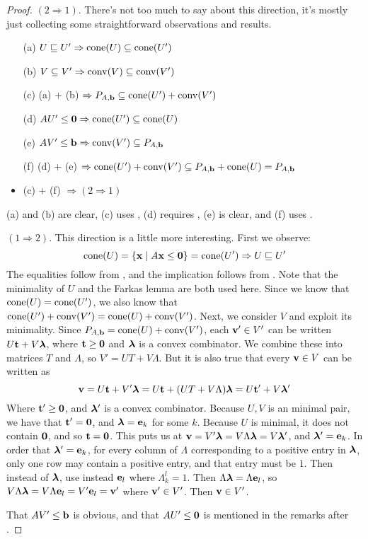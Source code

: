 \begin{proof}
	$(2 \Rightarrow 1)$.  There's not too much to say about this direction, it's mostly just collecting some straightforward observations and results.
	\begin{itemize}
		\item[(a)] $U \sqsubseteq U' \Rightarrow \operatorname{cone}(U) \subseteq \operatorname{cone}(U')$
		\item[(b)] $V \subseteq V' \Rightarrow \operatorname{conv}(V) \subseteq \operatorname{conv}(V')$
		\item[(c)] (a) + (b) $\Rightarrow P_{A,\mathbf{b}} \subseteq \operatorname{cone}(U') + \operatorname{conv}(V')$
		\item[(d)] $AU'\leq\mathbf{0} \Rightarrow \operatorname{cone}(U') \subseteq \operatorname{cone}(U)$
		\item[(e)] $AV'\leq\mathbf{b} \Rightarrow \operatorname{conv}(V') \subseteq P_{A,\mathbf{b}}$
		\item[(f)] (d) + (e) $\Rightarrow \operatorname{cone}(U') + \operatorname{conv}(V') \subseteq P_{A,\mathbf{b}} + \operatorname{cone}(U) = P_{A,\mathbf{b}}$
		\item (c) + (f) $\Rightarrow (2 \Rightarrow 1)$
	\end{itemize}
	(a) and (b) are clear, (c) uses , (d) requires , (e) is clear, and (f) uses .

	$(1 \Rightarrow 2)$.  This direction is a little more interesting.  First we observe:
	\[ \operatorname{cone}(U) = \left\{\mathbf{x}\;|\; A\mathbf{x}\leq\mathbf{0}\right\} = \operatorname{cone}(U') \Rightarrow U \sqsubseteq U' \]
	The equalities follow from , and the implication follows from .  Note that the minimality of $U$ and the Farkas lemma are both used here.  Since we know that $\operatorname{cone}(U) = \operatorname{cone}(U')$, we also know that $\operatorname{cone}(U') + \operatorname{conv}(V') = \operatorname{cone}(U) + \operatorname{conv}(V')$.  Next, we consider $V$ and exploit its minimality.  Since $P_{A,\mathbf{b}} = \operatorname{cone}(U) + \operatorname{conv}(V')$, each $\mathbf{v}'\in V'$ can be written $U\mathbf{t} + V\bm{\lambda}$, where $\mathbf{t} \geq \mathbf{0}$ and $\bm{\lambda}$ is a convex combinator.  We combine these into matrices $T$ and $\Lambda$, so $V' = UT + V\Lambda$.  But it is also true that every $\mathbf{v}\in V$ can be written as
	\[ \mathbf{v} = U\mathbf{t} + V'\bm{\lambda} = U\mathbf{t} + (UT + V\Lambda)\bm{\lambda} = U\mathbf{t}' + V\bm{\lambda}' \]
	Where $\mathbf{t}'\geq\mathbf{0}$, and $\bm{\lambda}'$ is a convex combinator.  Because $U,V$ is an minimal pair, we have that $\mathbf{t}'=\mathbf{0}$, and $\bm{\lambda} = \mathbf{e}_k$ for some $k$.  Because $U$ is minimal, it does not contain $\mathbf{0}$, and so $\mathbf{t} = \mathbf{0}$.  This puts us at $\mathbf{v} = V'\bm{\lambda} = V\Lambda\bm{\lambda} = V\bm{\lambda}'$, and $\bm{\lambda}' = \mathbf{e}_k$.  In order that $\bm{\lambda}' = \mathbf{e}_k$, for every column of $\Lambda$ corresponding to a positive entry in $\bm{\lambda}$, only one row may contain a positive entry, and that entry must be $1$.  Then instead of $\bm{\lambda}$, use instead $\mathbf{e}_l$ where $\Lambda_k^l = 1$.  Then $\Lambda\bm{\lambda} = \Lambda\mathbf{e}_l$, so $V\Lambda\bm{\lambda} = V\Lambda\mathbf{e}_l = V'\mathbf{e}_l=\mathbf{v}'$ where $\mathbf{v}'\in V'$.  Then $\mathbf{v} \in V'$.

	That $AV'\leq\mathbf{b}$ is obvious, and that $AU'\leq\mathbf{0}$ is mentioned in the remarks after .
\end{proof}

